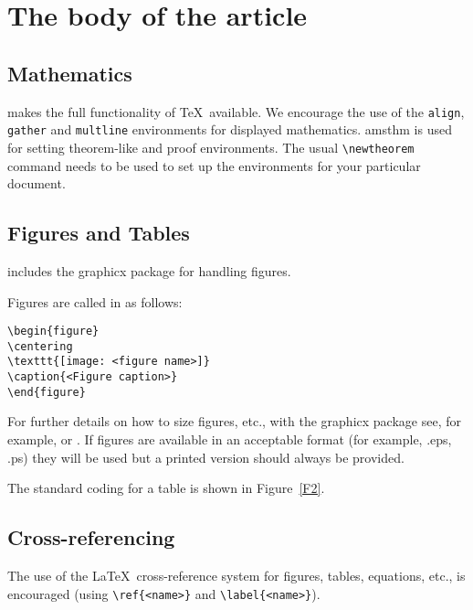 \documentclass[fonts]{icst}
\begin{document}
\section{The body of the article}

\subsection{Mathematics} \textsf{\journalclass} makes the full
functionality of \AmS\/\TeX\ available. We encourage the use of
the \verb"align", \verb"gather" and \verb"multline" environments
for displayed mathematics. \textsf{amsthm} is used for setting
theorem-like and proof environments. The usual \verb"\newtheorem"
command needs to be used to set up the environments for your
particular document.

\subsection{Figures and Tables} \textsf{\journalclass} includes the
\textsf{graphicx} package for handling figures.

Figures are called in as follows:
\begin{verbatim}
\begin{figure}
\centering
\texttt{[image: <figure name>]}
\caption{<Figure caption>}
\end{figure}
\end{verbatim}

For further details on how to size figures, etc., with the
\textsf{graphicx} package see, for example, \cite{R1}
or \cite{R3}. If figures are available in an
acceptable format (for example, .eps, .ps) they will be used but a
printed version should always be provided. \medbreak

The standard coding for a table is shown in Figure~\ref{F2}.

\subsection{Cross-referencing}
The use of the \LaTeX\ cross-reference system
for figures, tables, equations, etc., is encouraged
(using \verb"\ref{<name>}" and \verb"\label{<name>}").
\end{document}
